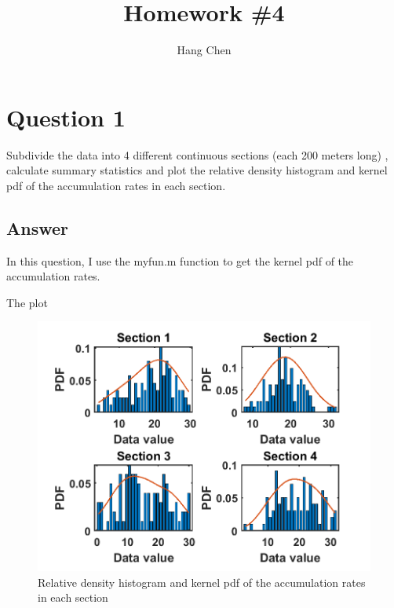 \documentclass[
	12pt, %
]{fphw}
\title{Homework \#4} %
\author{Hang Chen} %
\institute{Boise State University \\ Department of geoscience} %
\begin{document}
\maketitle %


\section*{Question 1}

\begin{problem}
Subdivide the data into 4 different continuous sections (each 200 meters long) , calculate
summary statistics and plot the relative density histogram and kernel pdf of the accumulation
rates in each section.

\end{problem}





\subsection*{Answer}
In this question, I use the myfun.m function to get the kernel pdf of the accumulation rates.

The plot

\begin{figure}[htbp]
	\centering
	\includegraphics[width=1\columnwidth]{Q1.png} 
	\caption{Relative density histogram and kernel pdf of the accumulation
		rates in each section}
\end{figure}
\end{document}
